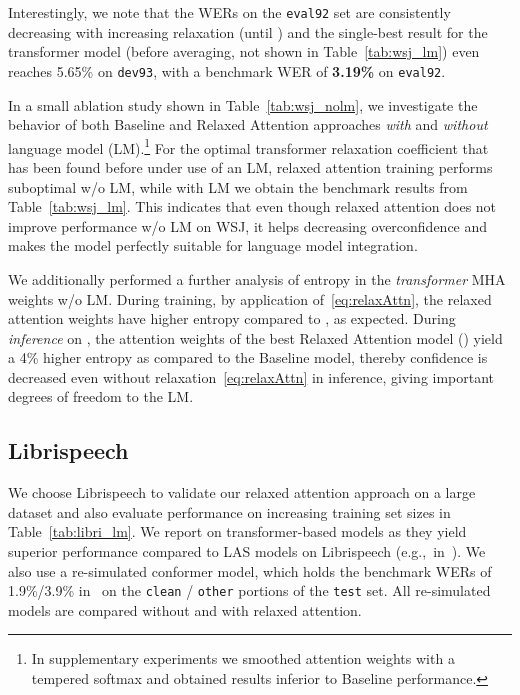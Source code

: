 \documentclass{article}
\begin{document}
Interestingly, we note that the WERs on the \texttt{eval92} set are consistently decreasing with increasing relaxation (until ) and the single-best result for the transformer model (before averaging, not shown in Table~\ref{tab:wsj_lm}) even reaches 5.65\% on \texttt{dev93}, with a benchmark WER of \textbf{3.19\%} on \texttt{eval92}.

In a small ablation study shown in Table~\ref{tab:wsj_nolm}, we investigate the behavior of both \textsf{Baseline} and \textsf{Relaxed Attention} approaches \textit{with} and \textit{without} language model (LM).\footnote{In supplementary experiments we smoothed attention weights with a tempered softmax and obtained results inferior to \textsf{Baseline} performance.} For the optimal transformer relaxation coefficient  that has been found before under use of an LM, relaxed attention training performs suboptimal w/o LM, while with LM we obtain the benchmark results from Table~\ref{tab:wsj_lm}. This indicates that even though relaxed attention does not improve performance w/o LM on WSJ, it helps decreasing overconfidence and makes the model perfectly suitable for language model integration.

We additionally performed a further analysis of entropy in the \textit{transformer} MHA weights w/o LM. During training, by application of~\eqref{eq:relaxAttn}, the relaxed attention weights  have higher entropy compared to , as expected. During \textit{inference} on , the attention weights of the best \textsf{Relaxed Attention} model () yield a 4\% higher entropy as compared to the \textsf{Baseline} model, thereby confidence is decreased even without relaxation~\eqref{eq:relaxAttn} in inference, giving important degrees of freedom to the LM. 
  
\vspace{-2mm}
\subsection{Librispeech}\vspace{-2.5mm}
We choose Librispeech to validate our relaxed attention approach on a large dataset and also evaluate performance on increasing training set sizes in Table~\ref{tab:libri_lm}. We report on transformer-based models as they yield superior performance compared to LAS models on Librispeech (e.g.,\ in~\cite{Karita2019,Zeyer2019}). We also use a re-simulated conformer model, which holds the benchmark WERs of 1.9\%/3.9\% in~\cite{Gulati2020} on the \texttt{clean} / \texttt{other} portions of the \texttt{test} set. All re-simulated models are compared without and with relaxed attention.
\end{document}
